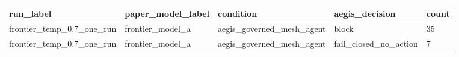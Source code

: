 \begin{tabular}{lllll}
 \hline
run\_label & paper\_model\_label & condition & aegis\_decision & count \\
 \hline
frontier\_temp\_0.7\_one\_run & frontier\_model\_a & aegis\_governed\_mesh\_agent & block & 35 \\
frontier\_temp\_0.7\_one\_run & frontier\_model\_a & aegis\_governed\_mesh\_agent & fail\_closed\_no\_action & 7 \\
 \hline
\end{tabular}
